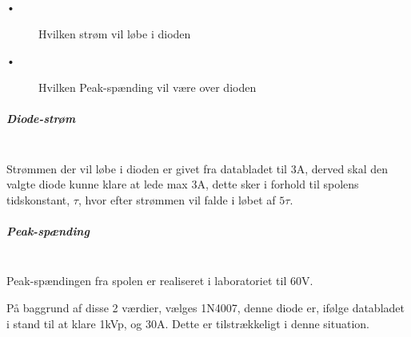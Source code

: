 \begin{description}
 \item[•] Hvilken strøm vil løbe i dioden
 \item[•] Hvilken Peak-spænding vil være over dioden
\end{description}

\subparagraph{Diode-strøm} \hspace{0pt} \\
Strømmen der vil løbe i dioden er givet fra databladet til  3A, derved skal den valgte diode kunne klare at lede max 3A, dette sker i forhold til spolens tidskonstant, $\tau$, hvor efter strømmen vil falde i løbet af $ 5 \tau$.

\subparagraph{Peak-spænding} \hspace{0pt} \\
Peak-spændingen fra spolen er realiseret i laboratoriet til 60V. 

På baggrund af disse 2 værdier, vælges 1N4007, denne diode er, ifølge databladet i stand til at klare 1kVp, og 30A. Dette er tilstrækkeligt i denne situation.